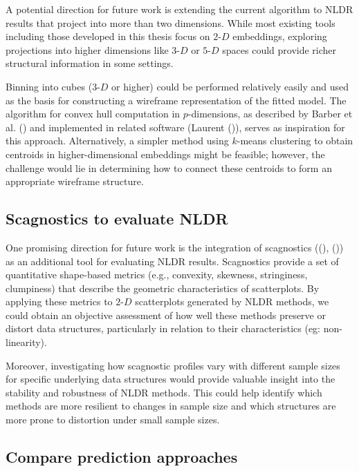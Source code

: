 \documentclass[
  11pt,
  a4paper,
]{report}
\begin{document}
A potential direction for future work is extending the current algorithm
to NLDR results that project into more than two dimensions. While most
existing tools including those developed in this thesis focus on
\(2\text{-}D\) embeddings, exploring projections into higher dimensions
like \(3\text{-}D\) or \(5\text{-}D\) spaces could provide richer
structural information in some settings.

Binning into cubes (\(3\text{-}D\) or higher) could be performed
relatively easily and used as the basis for constructing a wireframe
representation of the fitted model. The algorithm for convex hull
computation in \(p\)-dimensions, as described by Barber et al.
() and implemented in related software
(Laurent ()), serves as inspiration for
this approach. Alternatively, a simpler method using \(k\)-means
clustering to obtain centroids in higher-dimensional embeddings might be
feasible; however, the challenge would lie in determining how to connect
these centroids to form an appropriate wireframe structure.

\subsection{Scagnostics to evaluate
NLDR}\label{scagnostics-to-evaluate-nldr}

One promising direction for future work is the integration of
scagnostics ((),
()) as an additional tool for
evaluating NLDR results. Scagnostics provide a set of quantitative
shape-based metrics (e.g., convexity, skewness, stringiness, clumpiness)
that describe the geometric characteristics of scatterplots. By applying
these metrics to \(2\text{-}D\) scatterplots generated by NLDR methods,
we could obtain an objective assessment of how well these methods
preserve or distort data structures, particularly in relation to their
characteristics (eg: non-linearity).

Moreover, investigating how scagnostic profiles vary with different
sample sizes for specific underlying data structures would provide
valuable insight into the stability and robustness of NLDR methods. This
could help identify which methods are more resilient to changes in
sample size and which structures are more prone to distortion under
small sample sizes.

\subsection{Compare prediction
approaches}\label{compare-prediction-approaches}
\end{document}
